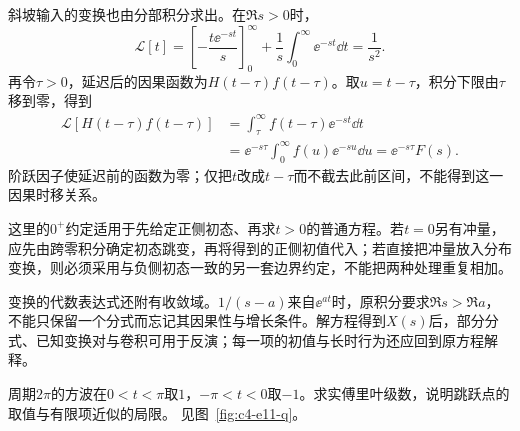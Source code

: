 斜坡输入的变换也由分部积分求出。在$\Re s>0$时，
\[
 \mathcal L[t]=\left[-\frac{t\ee^{-st}}s\right]_0^\infty
 +\frac1s\int_0^\infty\ee^{-st}\dd t
 =\frac1{s^2}.
\]
再令$\tau>0$，延迟后的因果函数为$H(t-\tau)f(t-\tau)$。取$u=t-\tau$，积分下限由$\tau$移到零，得到
\[
\begin{aligned}
 \mathcal L[H(t-\tau)f(t-\tau)]
 &=\int_\tau^\infty f(t-\tau)\ee^{-st}\dd t\\
 &=\ee^{-s\tau}\int_0^\infty f(u)\ee^{-su}\dd u
 =\ee^{-s\tau}F(s).
\end{aligned}
\]
阶跃因子使延迟前的函数为零；仅把$t$改成$t-\tau$而不截去此前区间，不能得到这一因果时移关系。

这里的$0^+$约定适用于先给定正侧初态、再求$t>0$的普通方程。若$t=0$另有冲量，应先由跨零积分确定初态跳变，再将得到的正侧初值代入；若直接把冲量放入分布变换，则必须采用与负侧初态一致的另一套边界约定，不能把两种处理重复相加。

变换的代数表达式还附有收敛域。$1/(s-a)$来自$\ee^{at}$时，原积分要求$\Re s>\Re a$，不能只保留一个分式而忘记其因果性与增长条件。解方程得到$X(s)$后，部分分式、已知变换对与卷积可用于反演；每一项的初值与长时行为还应回到原方程解释。

\begin{example}[方波级数与有限谐波近似]\label{ex:c4-e11}
周期$2\pi$的方波在$0<t<\pi$取$1$，$-\pi<t<0$取$-1$。求实傅里叶级数，说明跳跃点的取值与有限项近似的局限。 见图~\ref{fig:c4-e11-q}。
\end{example}

